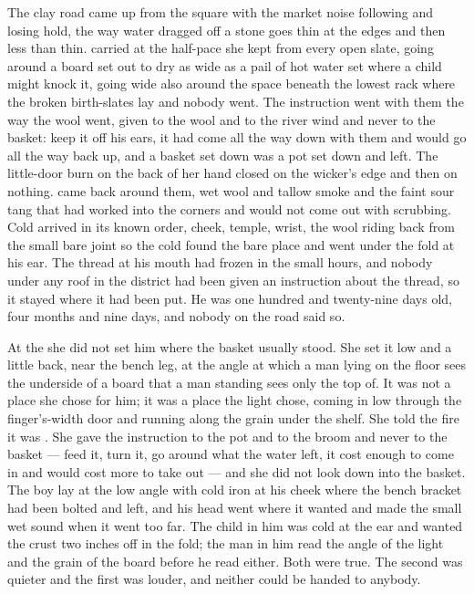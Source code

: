 The clay road came up from the square with the market noise following and losing hold, the way water dragged off a stone goes thin at the edges and then less than thin.  carried  at the half-pace she kept from every open slate, going around a board set out to dry as wide as a pail of hot water set where a child might knock it, going wide also around the space beneath the lowest rack where the broken birth-slates lay and nobody went. The instruction went with them the way the wool went, given to the wool and to the river wind and never to the basket: keep it off his ears, it had come all the way down with them and would go all the way back up, and a basket set down was a pot set down and left. The little-door burn on the back of her hand closed on the wicker's edge and then on nothing.  came back around them, wet wool and tallow smoke and the faint sour tang that had worked into the corners and would not come out with scrubbing. Cold arrived in its known order, cheek, temple, wrist, the wool riding back from the small bare joint so the cold found the bare place and went under the fold at his ear. The thread at his mouth had frozen in the small hours, and nobody under any roof in the district had been given an instruction about the thread, so it stayed where it had been put. He was one hundred and twenty-nine days old, four months and nine days, and nobody on the road said so.

At the  she did not set him where the basket usually stood. She set it low and a little back, near the bench leg, at the angle at which a man lying on the floor sees the underside of a board that a man standing sees only the top of. It was not a place she chose for him; it was a place the light chose, coming in low through the finger's-width door and running along the grain under the shelf. She told the fire it was . She gave the instruction to the pot and to the broom and never to the basket --- feed it, turn it, go around what the water left, it cost enough to come in and would cost more to take out --- and she did not look down into the basket. The boy lay at the low angle with cold iron at his cheek where the bench bracket had been bolted and left, and his head went where it wanted and made the small wet sound when it went too far. The child in him was cold at the ear and wanted the crust two inches off in the fold; the man in him read the angle of the light and the grain of the board before he read either. Both were true. The second was quieter and the first was louder, and neither could be handed to anybody.


